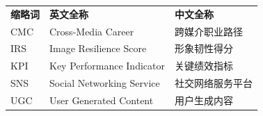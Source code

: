 
\begin{longtable}{p{2.6cm}p{6.2cm}p{4.7cm}}
\textbf{缩略词} & \textbf{英文全称} & \textbf{中文全称} \\
CMC & Cross-Media Career & 跨媒介职业路径 \\
IRS & Image Resilience Score & 形象韧性得分 \\
KPI & Key Performance Indicator & 关键绩效指标 \\
SNS & Social Networking Service & 社交网络服务平台 \\
UGC & User Generated Content & 用户生成内容 \\
\end{longtable}
